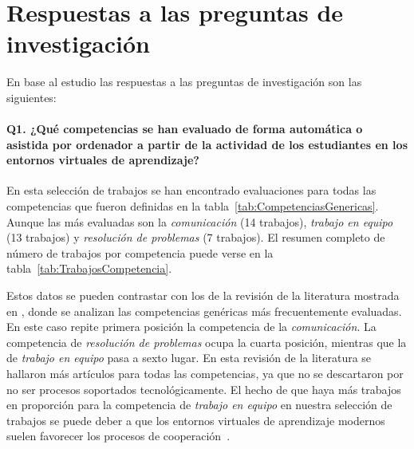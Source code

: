 \pagestyle{fancy}
\section{Respuestas a las preguntas de investigación}

En base al estudio las respuestas a las preguntas de investigación son las siguientes:

\paragraph*{Q1. ¿Qué competencias se han evaluado de forma automática o asistida por ordenador  a partir de la actividad de los estudiantes en los entornos virtuales de aprendizaje?}


En esta selección de trabajos se han encontrado evaluaciones para todas las competencias que fueron definidas en la tabla~\ref{tab:CompetenciasGenericas}. Aunque las más evaluadas son la \emph{comunicación} (14 trabajos), \emph{trabajo en equipo} (13 trabajos) y \emph{resolución de problemas} (7 trabajos). El resumen completo de número de trabajos por competencia puede verse en la tabla~\ref{tab:TrabajosCompetencia}.

Estos datos se pueden contrastar con los de la revisión de la literatura mostrada en \cite{strijbos2015criteria}, donde se analizan las competencias genéricas más frecuentemente evaluadas. En este caso repite primera posición la competencia de la \emph{comunicación}. La competencia de \emph{resolución de problemas} ocupa la cuarta posición, mientras que la de \emph{trabajo en equipo} pasa a sexto lugar. En esta revisión de la literatura se hallaron más artículos para todas las competencias, ya que no se descartaron por no ser procesos soportados tecnológicamente. El hecho de que haya más trabajos en proporción para la competencia de \emph{trabajo en equipo} en nuestra selección de trabajos se puede deber a que los entornos virtuales de aprendizaje modernos suelen favorecer los procesos de cooperación~\cite{i2007competencias}.


